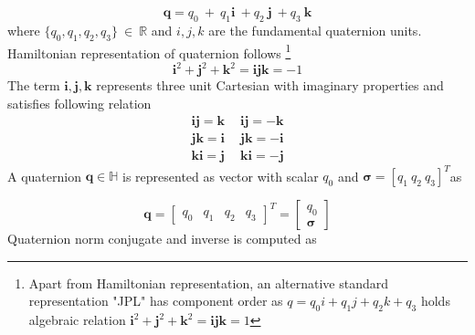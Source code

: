 \begin{equation}
\mathbf{q} =q_{0} \ +\ q_{1}\mathbf{i} \ +q_{2} \ \mathbf{j} \ +q_{3} \ \mathbf{k}
\end{equation}
where $\displaystyle \{q_{0} ,q_{1} ,q_{2} ,q_{3}\} \ \in \ \mathbb{R}$ and $\displaystyle i,j,k$ are the fundamental quaternion units. Hamiltonian representation of quaternion follows \footnote{Apart from Hamiltonian representation, an alternative standard representation "JPL" \cite{Ortega2016QuaternionKF} has component order as $q=q_0i+q_1j+q_2k+q_3$ holds algebraic relation 
$\mathbf{i}^{2} +\mathbf{j}^{2} +\mathbf{k}^{2} =\mathbf{ijk} =1$}
\begin{equation}
\mathbf{i}^{2} +\mathbf{j}^{2} +\mathbf{k}^{2} =\mathbf{ijk} =-1
\end{equation}
The term $\displaystyle \mathbf{i} ,\mathbf{j} ,\mathbf{k}$ represents three unit Cartesian with imaginary properties and satisfies following relation
\begin{gather*}
\mathbf{ij} =\mathbf{k} \ \quad \mathbf{ij} =-\mathbf{k}\\
\mathbf{jk} =\mathbf{i} \ \quad \mathbf{jk} =-\mathbf{i}\\
\mathbf{ki} =\mathbf{j} \ \quad \mathbf{ki} =-\mathbf{j}
\end{gather*}
A quaternion $\displaystyle \mathbf{q} \in \mathbb{H}$ is represented as vector with scalar $\displaystyle q_{0}$ and $\displaystyle \mathbf{\sigma } =[ q_{1} \ q_{2} \ q_{3}]^{T}$as


\begin{equation*}
\mathbf{q} =\begin{bmatrix}
q_{0} & q_{1} & q_{2} & q_{3}
\end{bmatrix}^{T} =\begin{bmatrix}
q_{0}\\
\mathbf{\sigma }
\end{bmatrix}
\end{equation*}
Quaternion norm conjugate and inverse is computed as


